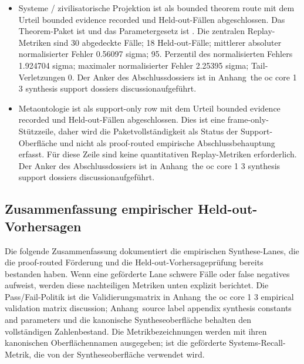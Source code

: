 \begin{itemize}[leftmargin=1.6em,nosep]
\item Systeme / zivilisatorische Projektion ist als bounded theorem route mit dem Urteil bounded evidence recorded und  Held-out-Fällen abgeschlossen. Das Theorem-Paket ist  und das Parametergesetz ist . Die zentralen Replay-Metriken sind 30 abgedeckte Fälle; 18 Held-out-Fälle; mittlerer absoluter normalisierter Fehler 0.56097 sigma; 95. Perzentil des normalisierten Fehlers 1.924704 sigma; maximaler normalisierter Fehler 2.25395 sigma; Tail-Verletzungen 0. Der Anker des Abschlussdossiers ist in Anhang~the oc core 1 3 synthesis support dossiers discussionaufgeführt.
\item Metaontologie ist als support-only row mit dem Urteil bounded evidence recorded und  Held-out-Fällen abgeschlossen. Dies ist eine frame-only-Stützzeile, daher wird die Paketvollständigkeit als Status der Support-Oberfläche und nicht als proof-routed empirische Abschlussbehauptung erfasst. Für diese Zeile sind keine quantitativen Replay-Metriken erforderlich. Der Anker des Abschlussdossiers ist in Anhang~the oc core 1 3 synthesis support dossiers discussionaufgeführt.
\end{itemize}

\subsection{Zusammenfassung empirischer Held-out-Vorhersagen}
Die folgende Zusammenfassung dokumentiert die empirischen Synthese-Lanes, die die proof-routed Förderung und die Held-out-Vorhersageprüfung bereits bestanden haben.
Wenn eine geförderte Lane schwere Fälle oder false negatives aufweist, werden diese nachteiligen Metriken unten explizit berichtet. Die Pass/Fail-Politik ist die Validierungsmatrix in Anhang~the oc core 1 3 empirical validation matrix discussion; Anhang~source label appendix synthesis constants and parameters und die kanonische Syntheseoberfläche behalten den vollständigen Zahlenbestand.
Die Metrikbezeichnungen werden mit ihren kanonischen Oberflächennamen ausgegeben;  ist die geförderte Systems-Recall-Metrik, die von der Syntheseoberfläche verwendet wird.

